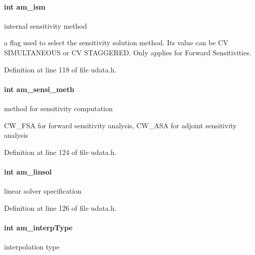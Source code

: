 \paragraph[{am\+\_\+ism}]{\setlength{\rightskip}{0pt plus 5cm}int am\+\_\+ism}\label{struct_user_data_a1f2514c0ee00da61ade386173b718a02}
internal sensitivity method

a flag used to select the sensitivity solution method. Its value can be C\+V S\+I\+M\+U\+L\+T\+A\+N\+E\+O\+U\+S or C\+V S\+T\+A\+G\+G\+E\+R\+E\+D. Only applies for Forward Sensitivities. 

Definition at line 118 of file udata.\+h.

\hypertarget{struct_user_data_a83bc6716ecf3decb3d963929361fcd6d}{}
\paragraph[{am\+\_\+sensi\+\_\+meth}]{\setlength{\rightskip}{0pt plus 5cm}int am\+\_\+sensi\+\_\+meth}\label{struct_user_data_a83bc6716ecf3decb3d963929361fcd6d}
method for sensitivity computation

C\+W\+\_\+\+F\+S\+A for forward sensitivity analysis, C\+W\+\_\+\+A\+S\+A for adjoint sensitivity analysis 

Definition at line 124 of file udata.\+h.

\hypertarget{struct_user_data_a03fa52449ab4bb9a1a75312fd9064db1}{}
\paragraph[{am\+\_\+linsol}]{\setlength{\rightskip}{0pt plus 5cm}int am\+\_\+linsol}\label{struct_user_data_a03fa52449ab4bb9a1a75312fd9064db1}
linear solver specification 

Definition at line 126 of file udata.\+h.

\hypertarget{struct_user_data_a02adc800558b1cdac3fa8bc96e65dbbb}{}
\paragraph[{am\+\_\+interp\+Type}]{\setlength{\rightskip}{0pt plus 5cm}int am\+\_\+interp\+Type}\label{struct_user_data_a02adc800558b1cdac3fa8bc96e65dbbb}
interpolation type

